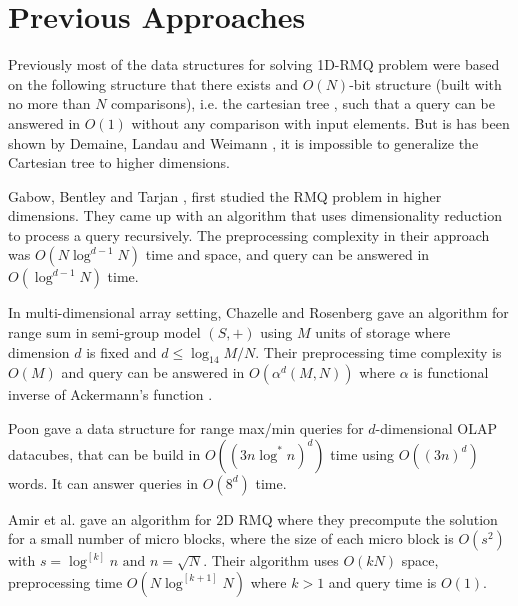 \section{Previous Approaches}
Previously most of the data structures for solving 1D-RMQ problem were based on the following structure that there exists and $O(N)$-bit structure (built with no more than $N$ comparisons), i.e. the cartesian tree \cite{p9}, such that a query can be answered in $O(1)$ without any comparison with input elements. But is has been shown by Demaine, Landau and Weimann \cite{p2}, it is impossible to generalize the Cartesian tree to higher dimensions.

Gabow, Bentley and Tarjan \cite{p5}, first studied the RMQ problem in higher dimensions. They came up with an algorithm that uses dimensionality reduction to process a query recursively. The preprocessing complexity in their approach was $O(N\log^{d-1}N)$ time and space, and query can be answered in $O(\log^{d-1}N)$ time.

In multi-dimensional array setting, Chazelle and Rosenberg \cite{p3} gave an algorithm for range sum in semi-group model $(S, +)$ using $M$ units of storage where dimension $d$ is fixed and \( d \leq \log_{14} M/N\). Their preprocessing time complexity is $O(M)$ and query can be answered in \(O(\alpha^{d}(M,N))\) where $\alpha$ is functional inverse of Ackermann's function \cite{p8}.

Poon \cite{p6} gave a data structure for range max/min queries for $d$-dimensional OLAP datacubes, that can be build in $O((3n\log^*n)^d)$ time using $O((3n)^d)$ words. It can answer queries in $O(8^d)$ time.

Amir et al. \cite{p7} gave an algorithm for $2$D RMQ where they precompute the solution for a small number of micro blocks, where the size of each micro block is $O(s^2)$ with $s = \log^{[k]} n \text{ and } n = \sqrt N$. Their algorithm uses $O(kN)$ space, preprocessing time $O(N\log^{[k+1]}N)$ where $k > 1$ and query time is $O(1)$.
